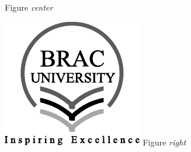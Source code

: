 \documentclass[12pt]{exam}
\begin{document}
\begin{questions}
\begin{minipage}[t]{0.3\textwidth}
    Figure \emph{center}
\end{minipage}\hfill
\begin{minipage}[t]{0.3\textwidth}
    \centering
    \includegraphics[width=\linewidth]{bracu_logo_ai.pdf}
    Figure \emph{right}
\end{minipage}
\end{questions}
\printanswers
\end{document}
